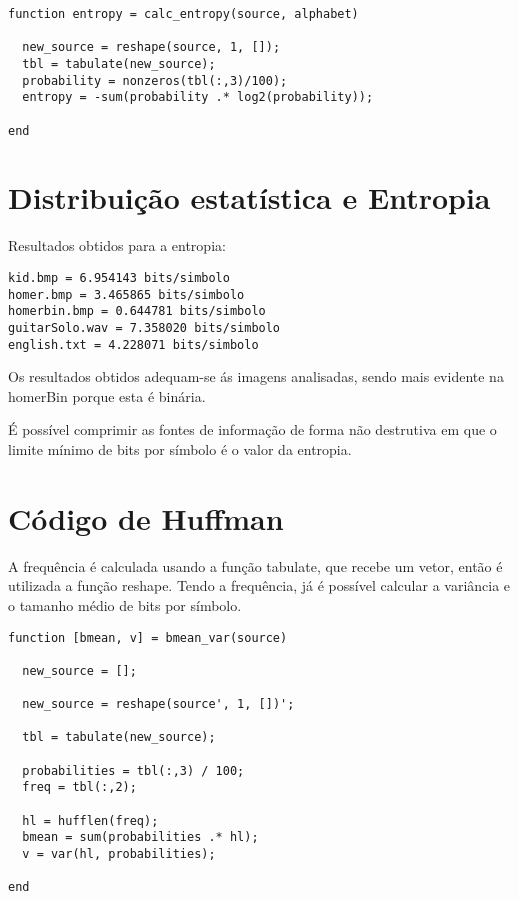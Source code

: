 \documentclass[11pt]{article}
\begin{document}
\begin{lstlisting}
function entropy = calc_entropy(source, alphabet)

  new_source = reshape(source, 1, []);
  tbl = tabulate(new_source);
  probability = nonzeros(tbl(:,3)/100);
  entropy = -sum(probability .* log2(probability));

end
\end{lstlisting}

\newpage
\section{Distribuição estatística e Entropia}
Resultados obtidos para a entropia:
\begin{lstlisting}
kid.bmp = 6.954143 bits/simbolo
homer.bmp = 3.465865 bits/simbolo
homerbin.bmp = 0.644781 bits/simbolo
guitarSolo.wav = 7.358020 bits/simbolo
english.txt = 4.228071 bits/simbolo
\end{lstlisting}
Os resultados obtidos adequam-se ás imagens analisadas, sendo mais evidente na homerBin porque esta é binária.
\par
É possível comprimir as fontes de informação de forma não destrutiva em que o limite mínimo de bits por símbolo é o valor da entropia.
\section{Código de Huffman}
A frequência é calculada usando a função tabulate, que recebe um vetor, então é utilizada a função reshape. Tendo a frequência, já é possível calcular a variância e o tamanho médio de bits por símbolo.
\begin{lstlisting}
function [bmean, v] = bmean_var(source)

  new_source = [];

  new_source = reshape(source', 1, [])';

  tbl = tabulate(new_source);

  probabilities = tbl(:,3) / 100;
  freq = tbl(:,2);

  hl = hufflen(freq);
  bmean = sum(probabilities .* hl);
  v = var(hl, probabilities);

end
\end{lstlisting}
\end{document}
